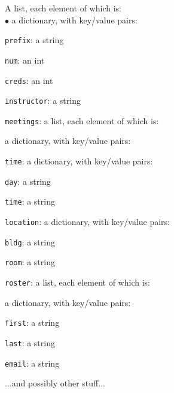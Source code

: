 \large
\noindent A list, each element of which is:\\
$\bullet$ a dictionary, with key/value pairs:
        \begin{compactenum}
        \item \texttt{prefix}: a string
        \item \texttt{num}: an int
        \item \texttt{creds}: an int
        \item \texttt{instructor}: a string
        \item \texttt{meetings}: a list, each element of which is:
            \begin{compactitem}
            \item a dictionary, with key/value pairs:
                \begin{compactenum}
                \item \texttt{time}: a dictionary, with key/value pairs:
                    \begin{compactenum}
                    \item \texttt{day}: a string
                    \item \texttt{time}: a string
                    \end{compactenum}
                \item \texttt{location}: a dictionary, with key/value pairs:
                    \begin{compactenum}
                    \item \texttt{bldg}: a string
                    \item \texttt{room}: a string
                    \end{compactenum}
                \end{compactenum}
            \end{compactitem}
        \item \texttt{roster}: a list, each element of which is:
            \begin{compactitem}
            \item a dictionary, with key/value pairs:
                \begin{compactenum}
                \item \texttt{first}: a string
                \item \texttt{last}: a string
                \item \texttt{email}: a string
                \end{compactenum}
            \end{compactitem}
        \item ...and possibly other stuff...
        \end{compactenum}

